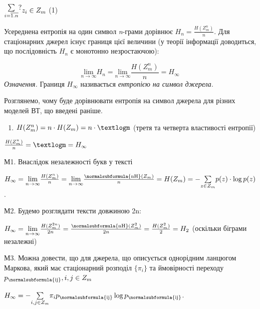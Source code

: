 {\centering
  $\begin{matrix}\underset{i=\overline{1\text{.}n}}{\sum }?\hfill\null
\end{matrix}{z_{i}\in Z_{m}}\hfill $  (1)
\par}

Усереднена ентропія на один символ \textit{n}{}-грами дорівнює 
$H_{n}=\frac{H(Z_{m}^{n})}n$. Для стаціонарних джерел існує границя
цієї величини (у теорії інформації доводиться, що послідовність  $H_n$ є
монотонно незростаючою):

\begin{equation*}
{\underset{n\rightarrow \infty }{\text{lim}}H_{n}=\underset{{n\rightarrow
\infty }}{\text{lim}}\frac{H(Z_{m}^{n})}{n}=H_{\infty }}
\end{equation*}
\textit{Означення.} Границя  $H_{\infty }$ називається \textit{ентропією на
символ джерела}. 


\bigskip

Розглянемо, чому буде дорівнювати ентропія на символ джерела для різних моделей
ВТ, що введені раніше.

\liststyleWWviiiNumxvi
\begin{enumerate}
\item  $H(Z_{m}^{n})=n\cdot H(Z_{m})=n\cdot \textlogm$ (третя та
четверта властивості ентропії)
\end{enumerate}
{\centering  $\frac{H(Z_{m}^{n})}{n}=\textlogm=H_{\infty }$\par}

М1. Внаслідок незалежності букв у тексті

{\centering
 ${H_{\infty }=\underset{{n\rightarrow \infty
}}{\text{lim}}\frac{H(Z_{m}^{n})}{n}=\underset{{n\rightarrow \infty
}}{\text{lim}}\frac{\normalsubformula{\text{nH}}(Z_{m})}{n}=H(Z_{m})=-\underset{{z\in
Z_{m}}}{\sum }{p(z)\cdot \log p(z)}}$.
\par}

М2. Будемо розглядати тексти довжиною 2n:

 ${H_{\infty }=\underset{{n\rightarrow \infty
}}{\text{lim}}\frac{H(Z_{m}^{{2n}})}{2n}=\frac{\normalsubformula{\text{nH}}(Z_{m}^{2})}{2n}=\frac{H(Z_{m}^{2})}{2}=H_{2}}$
(оскільки біграми незалежні)

М3. Можна довести, що для джерела, що описується однорідним ланцюгом Маркова,
який має стаціонарний розподіл  $\{\pi _i\}$ та ймовірності переходу 
$p_{\normalsubformula{\text{ij}}},i,j\in Z_m$

{\centering
 ${H_{\infty }=-\underset{i,j\in Z_{{m}}}{\sum }{\pi
_{i}p_{\normalsubformula{\text{ij}}}\log p_{\normalsubformula{\text{ij}}}}}$.
\par}


